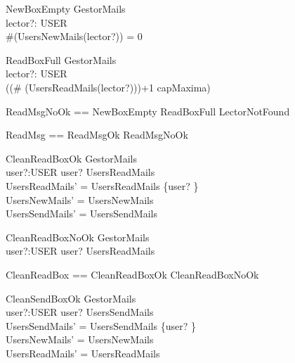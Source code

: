 \begin{schema}{NewBoxEmpty}
\Xi GestorMails \\
lector?: USER \\
\where
\#(UsersNewMails(lector?)) = 0
\end{schema}

\begin{schema}{ReadBoxFull}
\Xi GestorMails \\
lector?: USER \\
\where
\lnot ((\# (UsersReadMails(lector?)))+1 \leq capMaxima)
\end{schema}

\begin{zed}
ReadMsgNoOk == NewBoxEmpty \lor ReadBoxFull \lor LectorNotFound \\
\end{zed}
\begin{zed}
ReadMsg == ReadMsgOk \lor ReadMsgNoOk \\
\end{zed}

\begin{schema}{CleanReadBoxOk}
\Delta GestorMails\\
user?:USER
\where
user? \in \dom UsersReadMails \\
UsersReadMails' =  UsersReadMails \oplus \{user? \mapsto \emptyset  \} \\
UsersNewMails' = UsersNewMails \\
UsersSendMails' = UsersSendMails
\end{schema}

\begin{schema}{CleanReadBoxNoOk}
\Xi GestorMails \\
user?:USER
\where
user? \notin \dom UsersReadMails \\
\end{schema}

\begin{zed}
CleanReadBox == CleanReadBoxOk \lor CleanReadBoxNoOk \\
\end{zed}

\begin{schema}{CleanSendBoxOk}
\Delta GestorMails\\
user?:USER
\where
user? \in \dom UsersSendMails \\
UsersSendMails' =  UsersSendMails \oplus \{user? \mapsto \emptyset  \} \\
UsersNewMails' = UsersNewMails \\
UsersReadMails' = UsersReadMails
\end{schema}

